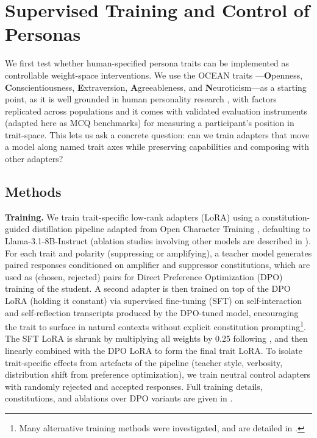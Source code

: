 \section{Supervised Training and Control of Personas}\label{sec:supervised}

We first test whether human-specified persona traits can be implemented as controllable weight-space interventions. We use the OCEAN traits \citep{mccrae1992introduction}---\textbf{O}penness, \textbf{C}onscientiousness, \textbf{E}xtraversion, \textbf{A}greeableness, and \textbf{N}euroticism---as a starting point, as it is well grounded in human personality research \citep{marsh2010new,saucier1999hierarchical}, with factors replicated across populations \citep{rolland2002cross} and it comes with validated evaluation instruments (adapted here as MCQ benchmarks) for measuring a participant’s position in trait-space. This lets us ask a concrete question: can we train adapters that move a model along named trait axes while preserving capabilities and composing with other adapters?

\subsection{Methods}\label{sec:methods}

\textbf{Training.} We train trait-specific low-rank adapters (LoRA) \citep{hu2021lora} using a constitution-guided distillation pipeline adapted from Open Character Training \citep{maiya2025opencharacter}, defaulting to Llama-3.1-8B-Instruct \citep{grattafiori2024llama} (ablation studies involving other models are described in ). For each trait and polarity (suppressing or amplifying), a teacher model generates paired responses conditioned on amplifier and suppressor constitutions, which are used as (chosen, rejected) pairs for Direct Preference Optimization (DPO) training \citep{rafailov2023direct} of the student. A second adapter is then trained on top of the DPO LoRA (holding it constant) via supervised fine-tuning (SFT) on self-interaction and self-reflection transcripts produced by the DPO-tuned model, encouraging the trait to surface in natural contexts without explicit constitution prompting\footnote{Many alternative training methods were investigated, and are detailed in .}. The SFT LoRA is shrunk by multiplying all weights by 0.25 following \citep{maiya2025opencharacter}, and then linearly combined with the DPO LoRA \citep{wortsman2022modelsoupsaveragingweights} to form the final trait LoRA. To isolate trait-specific effects from artefacts of the pipeline (teacher style, verbosity, distribution shift from preference optimization), we train neutral control adapters with randomly rejected and accepted responses. Full training details, constitutions, and ablations over DPO variants are given in .  

